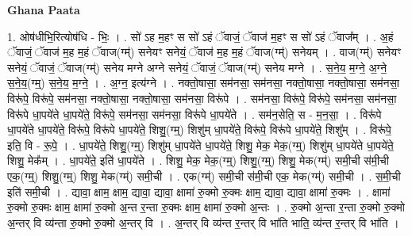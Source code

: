\documentclass[17pt]{extarticle}
\begin{document}
\textbf{Ghana Paata } \newline

1. ओष॑धीभि॒रित्योष॑धि - भिः॒ । . सो॑ ऽह म॒हꣳ स सो॑ ऽहं ॅवाजं॒ ॅवाज॑ म॒हꣳ स सो॑ ऽहं ॅवाज᳚म् । . अ॒हं ॅवाजं॒ ॅवाज॑ म॒ह म॒हं ॅवाज(ग्म्॑) सनेयꣳ सनेयं॒ ॅवाज॑ म॒ह म॒हं ॅवाज(ग्म्॑) सनेयम् । . वाज(ग्म्॑) सनेयꣳ सनेयं॒ ॅवाजं॒ ॅवाज(ग्म्॑) सनेय मग्ने अग्ने सनेयं॒ ॅवाजं॒ ॅवाज(ग्म्॑) सनेय मग्ने । . स॒ने॒य॒ म॒ग्ने॒ अ॒ग्ने॒ स॒ने॒य॒(ग्म्॒) स॒ने॒य॒ म॒ग्ने॒ । . अ॒ग्न॒ इत्य॑ग्ने । . नक्तो॒षासा॒ सम॑नसा॒ सम॑नसा॒ नक्तो॒षासा॒ नक्तो॒षासा॒ सम॑नसा॒ विरू॑पे॒ विरू॑पे॒ सम॑नसा॒ नक्तो॒षासा॒ नक्तो॒षासा॒ सम॑नसा॒ विरू॑पे । . सम॑नसा॒ विरू॑पे॒ विरू॑पे॒ सम॑नसा॒ सम॑नसा॒ विरू॑पे धा॒पये॑ते धा॒पये॑ते॒ विरू॑पे॒ सम॑नसा॒ सम॑नसा॒ विरू॑पे धा॒पये॑ते । . सम॑न॒सेति॒ स - म॒न॒सा॒ । . विरू॑पे धा॒पये॑ते धा॒पये॑ते॒ विरू॑पे॒ विरू॑पे धा॒पये॑ते॒ शिशु॒(ग्म्॒) शिशु॑म् धा॒पये॑ते॒ विरू॑पे॒ विरू॑पे धा॒पये॑ते॒ शिशु᳚म् । . विरू॑पे॒ इति॒ वि - रू॒पे॒ । . धा॒पये॑ते॒ शिशु॒(ग्म्॒) शिशु॑म् धा॒पये॑ते धा॒पये॑ते॒ शिशु॒ मेक॒ मेक॒(ग्म्॒) शिशु॑म् धा॒पये॑ते धा॒पये॑ते॒ शिशु॒ मेक᳚म् । . धा॒पये॑ते॒ इति॑ धा॒पये॑ते । . शिशु॒ मेक॒ मेक॒(ग्म्॒) शिशु॒(ग्म्॒) शिशु॒ मेक(ग्म्॑) समी॒ची स॑मी॒ची एक॒(ग्म्॒) शिशु॒(ग्म्॒) शिशु॒ मेक(ग्म्॑) समी॒ची । . एक(ग्म्॑) समी॒ची स॑मी॒ची एक॒ मेक(ग्म्॑) समी॒ची । . स॒मी॒ची इति॑ समी॒ची । . द्यावा॒ क्षाम॒ क्षाम॒ द्यावा॒ द्यावा॒ क्षामा॑ रु॒क्मो रु॒क्मः क्षाम॒ द्यावा॒ द्यावा॒ क्षामा॑ रु॒क्मः । . क्षामा॑ रु॒क्मो रु॒क्मः क्षाम॒ क्षामा॑ रु॒क्मो अ॒न्त र॒न्ता रु॒क्मः क्षाम॒ क्षामा॑ रु॒क्मो अ॒न्तः । . रु॒क्मो अ॒न्ता र॒न्ता रु॒क्मो रु॒क्मो अ॒न्तर् वि व्य॑न्ता रु॒क्मो रु॒क्मो अ॒न्तर् वि । . अ॒न्तर् वि व्य॑न्त र॒न्तर् वि भा॑ति भाति॒ व्य॑न्त र॒न्तर् वि भा॑ति । \newline
\end{document}
